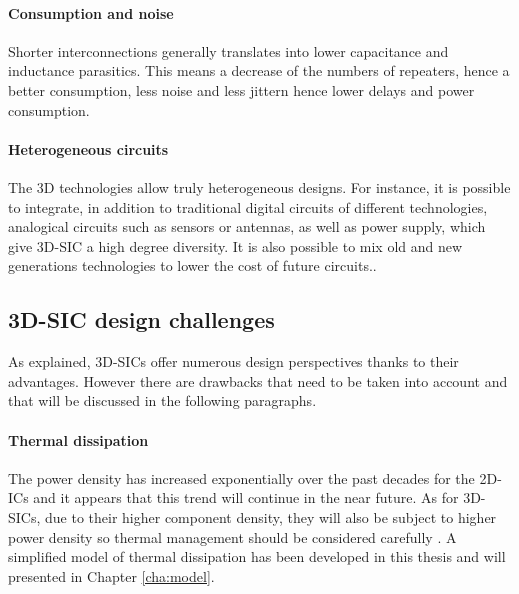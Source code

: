 \paragraph{Consumption and noise}

Shorter interconnections generally translates into lower capacitance and inductance parasitics. This means a decrease of the numbers of repeaters, hence a better consumption, less noise and less jittern hence lower delays and power consumption.

\paragraph{Heterogeneous circuits}

The 3D technologies allow truly heterogeneous designs. For instance, it is possible to integrate, in addition to traditional digital circuits of different technologies, analogical circuits such as sensors or antennas, as well as power supply, which give 3D-SIC a high degree diversity. It is also possible to mix old and new generations technologies to lower the cost of future circuits.\cite{4299568}.


\subsection{3D-SIC design challenges}

As explained, 3D-SICs offer numerous design perspectives thanks to their advantages. However there are drawbacks that need to be taken into account and that will be discussed in the following paragraphs.

\paragraph{Thermal dissipation}
The power density has increased exponentially over the past decades for the 2D-ICs and it appears that this trend will continue in the near future. As for 3D-SICs, due to their higher component density, they will also be subject to higher power density so thermal management should be considered carefully \cite{659500}. A simplified model of thermal dissipation has been developed in this thesis and will presented in Chapter \ref{cha:model}.

